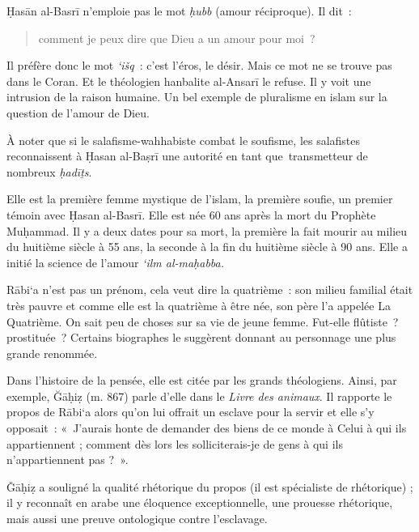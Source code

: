 Ḥasān al-Basrī n'emploie pas le mot \emph{ḥubb} (amour réciproque). Il
dit~: 
\begin{quote}
    comment je peux dire que Dieu a un amour pour moi~?
\end{quote}
 Il préfère
donc le mot \emph{`išq}~: c'est l'éros, le désir. Mais ce mot ne se
trouve pas dans le Coran. Et le théologien hanbalite al-Ansarī le
refuse. Il y voit une intrusion de la raison humaine. Un bel exemple de
pluralisme en islam sur la question de l'amour de Dieu.

À noter que si le salafisme-wahhabiste combat le soufisme, les
salafistes reconnaissent à Ḥasan al-Baṣrī une autorité en tant
que~transmetteur de nombreux \emph{ḥadīṯs}.


Elle est la première femme mystique de l'islam, la première soufie, un
premier témoin avec Ḥasan al-Basrī. Elle est née 60 ans après la mort du
Prophète Muḥammad. Il y a deux dates pour sa mort, la première la fait
mourir au milieu du huitième siècle à 55 ans, la seconde à la fin du
huitième siècle à 90 ans. Elle a initié la science de l'amour \emph{`ilm
al-maḥabba.}

Rābi`a n'est pas un prénom, cela veut dire la quatrième~: son milieu
familial était très pauvre et comme elle est la quatrième à être née,
son père l'a appelée La Quatrième. On sait peu de choses sur sa vie de
jeune femme. Fut-elle flûtiste~? prostituée~? Certains biographes le
suggèrent donnant au personnage une plus grande renommée.

Dans l'histoire de la pensée, elle est citée par les grands théologiens.
Ainsi, par exemple, Ğāḥiẓ (m. 867) parle d'elle dans le \emph{Livre des
animaux}. Il rapporte le propos de Rābi`a alors qu'on lui offrait un
esclave pour la servir et elle s'y opposait~: «~J'aurais honte de
demander des biens de ce monde à Celui à qui ils appartiennent ; comment
dès lors les solliciterais-je de gens à qui ils n'appartiennent pas ?~».

Ǧāḥiẓ a souligné la qualité rhétorique du propos (il est spécialiste de
rhétorique) ; il y reconnaît en arabe une éloquence exceptionnelle, une
prouesse rhétorique, mais aussi
une preuve ontologique contre l'esclavage.


